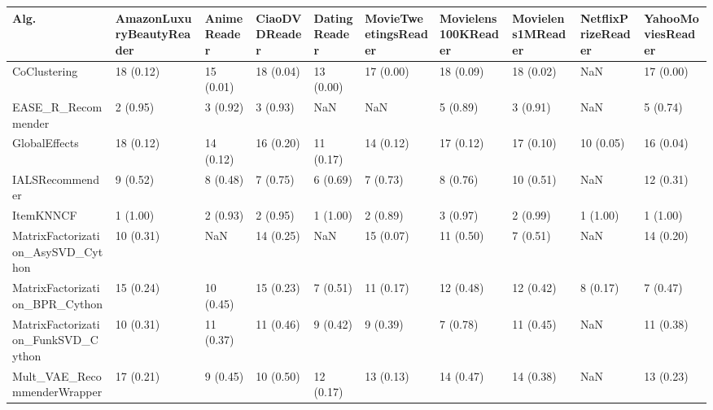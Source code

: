 \begin{tabular}{llllllllll}
\toprule
                               Alg. & AmazonLuxuryBeautyReader & AnimeReader & CiaoDVDReader & DatingReader & MovieTweetingsReader & Movielens100KReader & Movielens1MReader & NetflixPrizeReader & YahooMoviesReader \\
\midrule
                       CoClustering &                18 (0.12) &   15 (0.01) &     18 (0.04) &    13 (0.00) &            17 (0.00) &           18 (0.09) &         18 (0.02) &                NaN &         17 (0.00) \\
                 EASE\_R\_Recommender &                 2 (0.95) &    3 (0.92) &      3 (0.93) &          NaN &                  NaN &            5 (0.89) &          3 (0.91) &                NaN &          5 (0.74) \\
                      GlobalEffects &                18 (0.12) &   14 (0.12) &     16 (0.20) &    11 (0.17) &            14 (0.12) &           17 (0.12) &         17 (0.10) &          10 (0.05) &         16 (0.04) \\
                    IALSRecommender &                 9 (0.52) &    8 (0.48) &      7 (0.75) &     6 (0.69) &             7 (0.73) &            8 (0.76) &         10 (0.51) &                NaN &         12 (0.31) \\
                          ItemKNNCF &                 1 (1.00) &    2 (0.93) &      2 (0.95) &     1 (1.00) &             2 (0.89) &            3 (0.97) &          2 (0.99) &           1 (1.00) &          1 (1.00) \\
  MatrixFactorization\_AsySVD\_Cython &                10 (0.31) &         NaN &     14 (0.25) &          NaN &            15 (0.07) &           11 (0.50) &          7 (0.51) &                NaN &         14 (0.20) \\
     MatrixFactorization\_BPR\_Cython &                15 (0.24) &   10 (0.45) &     15 (0.23) &     7 (0.51) &            11 (0.17) &           12 (0.48) &         12 (0.42) &           8 (0.17) &          7 (0.47) \\
 MatrixFactorization\_FunkSVD\_Cython &                10 (0.31) &   11 (0.37) &     11 (0.46) &     9 (0.42) &             9 (0.39) &            7 (0.78) &         11 (0.45) &                NaN &         11 (0.38) \\
        Mult\_VAE\_RecommenderWrapper &                17 (0.21) &    9 (0.45) &     10 (0.50) &    12 (0.17) &            13 (0.13) &           14 (0.47) &         14 (0.38) &                NaN &         13 (0.23) \\

\end{tabular}
